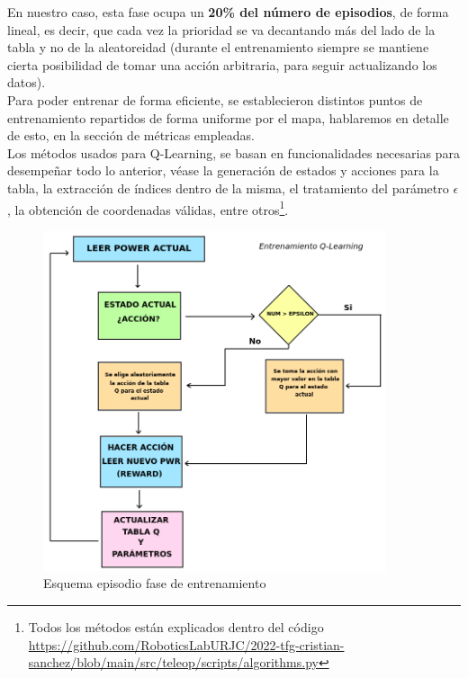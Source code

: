 En nuestro caso, esta fase ocupa un \textbf{20\% del número de episodios}, de forma lineal, es decir, que cada vez la prioridad se va decantando más del lado de la tabla y no de la aleatoreidad (durante el entrenamiento siempre se mantiene cierta posibilidad de tomar una acción arbitraria, para seguir actualizando los datos).\\

Para poder entrenar de forma eficiente, se establecieron distintos puntos de entrenamiento repartidos de forma uniforme por el mapa, hablaremos en detalle de esto, en la sección de métricas empleadas.\\

Los métodos usados para Q-Learning, se basan en funcionalidades necesarias para desempeñar todo lo anterior, véase la generación de estados y acciones para la tabla, la extracción de índices dentro de la misma, el tratamiento del parámetro $\epsilon$, la obtención de coordenadas válidas, entre otros\footnote[3]{Todos los métodos están explicados dentro del código \url{https://github.com/RoboticsLabURJC/2022-tfg-cristian-sanchez/blob/main/src/teleop/scripts/algorithms.py}}.\\

\begin{figure} [H]
    \begin{center}
    \includegraphics[height=10cm]{imagenes/cap4/11_diagrama_training.png}
    \end{center}
    \caption[Esquema episodio fase de entrenamiento]{Esquema episodio fase de entrenamiento}
    \label{fig:training_phase}
\end{figure}

